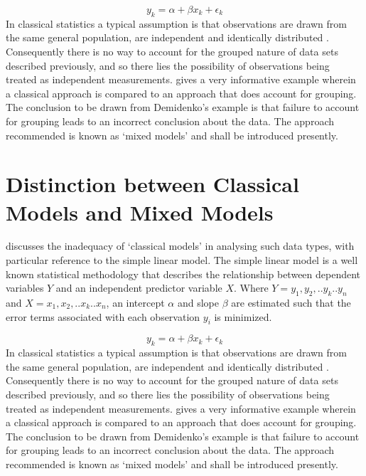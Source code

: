 \documentclass[12pt, a4paper]{report}
\theoremstyle{plain}
\theoremstyle{definition}
\theoremstyle{remark}
\begin{document}
\begin{equation}
y_{k} = \alpha + \beta x_{k}+ \epsilon_{k}
\end{equation}
In classical statistics a typical assumption is that observations
are drawn from the same general population, are independent and
identically distributed \citep{Demi}. Consequently there is no way
to account for the grouped nature of data sets described
previously, and so there lies the possibility of observations
being treated as independent measurements. \citet[pg.3]{Demi}
gives a very informative example wherein a classical approach is
compared to an approach that does account for grouping. The
conclusion to be drawn from Demidenko's example is that failure to
account for grouping leads to an incorrect conclusion about the
data. The approach recommended is known as `mixed models' and
shall be introduced presently.



\section{Distinction between Classical Models and Mixed Models}
\citet{Demi} discusses the inadequacy of `classical models' in
analysing such data types, with particular reference to the simple
linear model. The simple linear model is a well known statistical
methodology that describes the relationship between dependent
variables $Y$ and an independent predictor variable $X$. Where
$Y={y_{1},y_{2},..y_{k}..y_{n}}$ and
$X={x_{1},x_{2},..x_{k}..x_{n}}$, an intercept $\alpha$ and slope
$\beta$ are estimated such that the error terms associated with
each observation $y_{i}$ is minimized.

\begin{equation}
y_{k} = \alpha + \beta x_{k}+ \epsilon_{k}
\end{equation}
In classical statistics a typical assumption is that observations
are drawn from the same general population, are independent and
identically distributed \citep{Demi}. Consequently there is no way
to account for the grouped nature of data sets described
previously, and so there lies the possibility of observations
being treated as independent measurements. \citet[pg.3]{Demi}
gives a very informative example wherein a classical approach is
compared to an approach that does account for grouping. The
conclusion to be drawn from Demidenko's example is that failure to
account for grouping leads to an incorrect conclusion about the
data. The approach recommended is known as `mixed models' and
shall be introduced presently.
\end{document}
